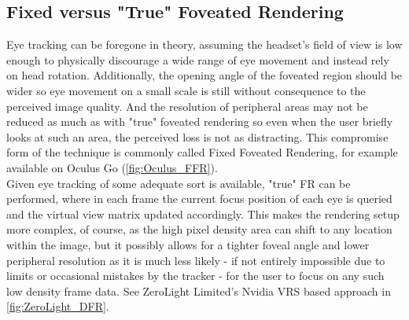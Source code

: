 \subsection{Fixed versus "True" Foveated Rendering}
Eye tracking can be foregone in theory, assuming the headset's field of view is low enough to physically discourage a wide range of eye movement and instead rely on head rotation. Additionally, the opening angle of the foveated region should be wider so eye movement on a small scale is still without consequence to the perceived image quality. And the resolution of peripheral areas may not be reduced as much as with "true" foveated rendering so even when the user briefly looks at such an area, the perceived loss is not as distracting. This compromise form of the technique is commonly called Fixed Foveated Rendering, for example available on Oculus Go (\autoref{fig:Oculus_FFR}). \\
Given eye tracking of some adequate sort is available, "true" FR can be performed, where in each frame the current focus position of each eye is queried and the virtual view matrix updated accordingly. This makes the rendering setup more complex, of course, as the high pixel density area can shift to any location within the image, but it possibly allows for a tighter foveal angle and lower peripheral resolution as it is much less likely - if not entirely impossible due to limits or occasional mistakes by the tracker - for the user to focus on any such low density frame data. See ZeroLight Limited's Nvidia VRS based approach in \autoref{fig:ZeroLight_DFR}. 

